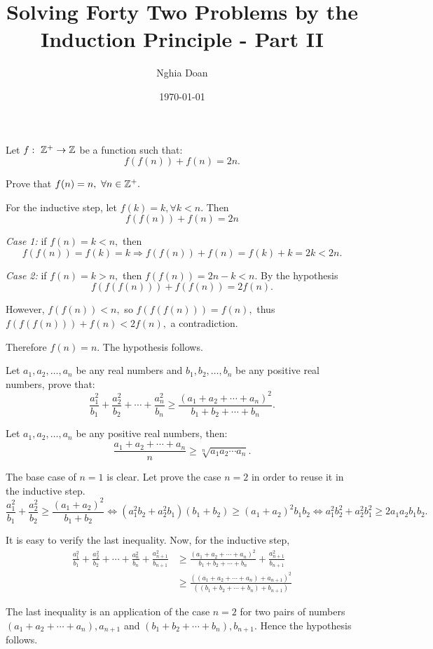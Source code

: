 \documentclass{article}
\title{Solving Forty Two Problems by the Induction Principle - Part II}
\author{Nghia Doan}
\date{\today}
\begin{document}
\maketitle

\begin{problem}
    Let $f:\ \mathbb Z^+ \rightarrow \mathbb Z$ be a function such that:
    \[
        f(f(n)) + f(n) = 2n.
    \]

    Prove that $f(n) = n,\ \forall n \in \mathbb Z^+.$
\end{problem}

\begin{soln}
    For the inductive step, let $f(k) = k, \forall k < n.$ Then
    \[
        f(f(n)) + f(n) = 2n
    \]

    \textit{Case 1:} if $f(n) = k < n,$ then 
    \[ 
        f(f(n)) = f(k) = k \Rightarrow f(f(n)) + f(n) = f(k) + k = 2k < 2n.
    \]
    
    \textit{Case 2:} if $f(n) = k > n,$ then $f(f(n)) = 2n - k < n.$ By the hypothesis 
    \[
        f(f(f(n))) + f(f(n)) = 2f(n).
    \] 

    However, $f(f(n)) < n,$ so $f(f(f(n))) = f(n),$ thus $f(f(f(n))) + f(n) < 2f(n),$ a contradiction.

    Therefore $f(n) = n.$ The hypothesis follows.
\end{soln}

\begin{problem}
    Let $a_1, a_2, \ldots, a_n$ be any real numbers and $b_1, b_2, \ldots, b_n$ be any positive real numbers, prove that:
    \[
        \frac{a_1^2}{b_1} + \frac{a_2^2}{b_2} + \cdots + \frac{a_n^2}{b_n} \ge \frac{(a_1 + a_2 + \cdots + a_n)^2}{b_1 + b_2 + \cdots + b_n}.
    \]

    Let $a_1, a_2, \ldots, a_n$ be any positive real numbers, then:
    \[
        \frac{a_1+a_2+\cdots+a_n}{n} \ge \sqrt[n]{a_1a_2 \cdots a_n}.
    \]
\end{problem}

\begin{soln}
    The base case of $n=1$ is clear. Let prove the case $n=2$ in order to reuse it in the inductive step.
    \[
        \frac{a_1^2}{b_1} + \frac{a_2^2}{b_2}  \ge \frac{(a_1 + a_2)^2}{b_1 + b_2}
        \Leftrightarrow (a_1^2b_2 + a_2^2b_1)(b_1+b_2) \ge (a_1+a_2)^2b_1b_2
        \Leftrightarrow a_1^2b_2^2 + a_2^2b_1^2 \ge 2a_1a_2b_1b_2.
    \]

    It is easy to verify the last inequality.
    Now, for the inductive step,
    \[
        \begin{aligned}
            \frac{a_1^2}{b_1} + \frac{a_2^2}{b_2} + \cdots + \frac{a_n^2}{b_n} + \frac{a_{n+1}^2}{b_{n+1}} 
            &\ge \frac{(a_1 + a_2 + \cdots + a_n)^2}{b_1 + b_2 + \cdots + b_n} + \frac{a_{n+1}^2}{b_{n+1}}\\
            &\ge \frac{((a_1 + a_2 + \cdots + a_n)+a_{n+1})^2}{((b_1 + b_2 + \cdots + b_n)+b_{n+1})}
        \end{aligned}
    \]

    The last inequality is an application of the case $n=2$ for two pairs of numbers $(a_1+a_2+\cdots+a_n),a_{n+1}$ and $(b_1 + b_2 + \cdots + b_n),b_{n+1}.$
    Hence the hypothesis follows.
\end{soln}
\end{document}
